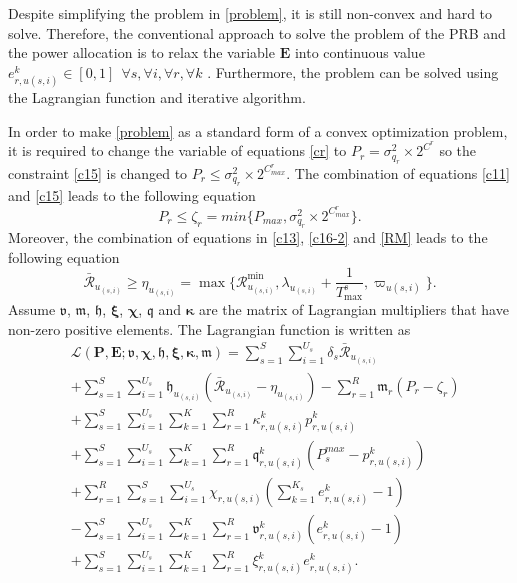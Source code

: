 \documentclass[lettersize,journal]{IEEEtran}
\begin{document}
Despite simplifying the problem in \eqref{problem}, it is still non-convex and hard to solve.
Therefore, the conventional approach to solve the problem of the PRB and the power allocation is to relax the variable $\mathbf{E}$ into continuous value $e_{r,u(s,i)}^k \in [0,1] \:\: \forall s , \forall i ,\forall r, \forall k$ \cite{lee2018dynamic,ali2018joint}.
Furthermore, the problem can be solved using the Lagrangian function and iterative algorithm.

In order to make \eqref{problem} as a standard form of a convex optimization problem, it is required to change the variable of equations \eqref{cr} to $P_r = \sigma_{q_r}^2\times 2^{C^r}$ so the constraint
\eqref{c15} is changed to
 $P_r \leq \sigma_{q_r}^2\times 2^{C^r_{max}}$.
The combination of equations \eqref{c11} and \eqref{c15} leads to the following equation
\begin{equation} \label{pr11}
P_r\leq \zeta_r= min\{P_{max}, \sigma_{q_r}^2\times 2^{C^r_{max}} \}. 
\end{equation}
Moreover, the combination of equations in \eqref{c13}, \eqref{c16-2} and \eqref{RM} leads to the following equation
\begin{equation}\label{RConstr}
\mathcal{\bar{R}}_{u_{(s,i)}} \geq\eta_{u_{(s,i)}}= \max\{\mathcal{R}_{u_{(s,i)}}^{\min}, \lambda_{u_{(s,i)}}+\frac{1}{T^s_{\max}}, \varpi_{u(s,i)} \}. 
\end{equation}
Assume $\boldsymbol{\mathfrak{v}}$, $\boldsymbol{\mathfrak{m}}$, $\boldsymbol{\mathfrak{h}}$, $\boldsymbol{\xi}$, $\boldsymbol{\chi}$, $\boldsymbol{\mathfrak{q}}$ and $\boldsymbol{ \kappa}$ are the matrix of Lagrangian multipliers that have non-zero positive elements. The Lagrangian function is written as
\begin{align}\label{lagrang}
&\mathcal{L}(\boldsymbol{P},\boldsymbol{E}; \boldsymbol{\mathfrak{v}}, \boldsymbol{\chi}, \boldsymbol{\mathfrak{h}}, \boldsymbol{ \xi}, \boldsymbol{ \kappa}, \boldsymbol{\mathfrak{m}})  = \sum\limits_{s=1}^{S} \sum\limits_{i=1}^{U_s}\delta_s\mathcal{\bar{R}}_{u_{(s,i)}}\nonumber\\
&+\sum\limits_{s=1}^{S} \sum\limits_{i=1}^{U_s}\mathfrak{h}_{u_{(s,i)}} (\mathcal{\bar{R}}_{u_{(s,i)}}-\eta_{u_{(s,i)}})-  \sum\limits_{r=1}^{R} \mathfrak{m}_{r} (P_{r}- \zeta_r)\nonumber\\
&+  \sum\limits_{s=1}^{S} \sum\limits_{i=1}^{U_s}\sum\limits_{k=1}^{K} \sum\limits_{r=1}^{R}\kappa^k_{r,u(s,i)}  p^k_{r,u(s,i)}\nonumber\\
&+  \sum\limits_{s=1}^{S} \sum\limits_{i=1}^{U_s}\sum\limits_{k=1}^{K} \sum\limits_{r=1}^{R}\mathfrak{q}^k_{r,u(s,i)} (P^{max}_{s}- p^k_{r,u(s,i)})\nonumber\\
&+ \sum\limits_{r=1}^{R}\sum\limits_{s=1}^{S} \sum\limits_{i=1}^{U_s}\chi_{r,u(s,i)}(\sum_{k =1}^{K_s} e^{k}_{r,u(s,i)} -1)\nonumber\\
&-  \sum\limits_{s=1}^{S} \sum\limits_{i=1}^{U_s}\sum\limits_{k=1}^{K} \sum\limits_{r=1}^{R}\mathfrak{v}^{k}_{r,u(s,i)} (e^{k}_{r,u(s,i)} -1)\nonumber\\
&+  \sum\limits_{s=1}^{S} \sum\limits_{i=1}^{U_s}\sum\limits_{k=1}^{K} \sum\limits_{r=1}^{R} \xi^{k}_{r,u(s,i)} e^{k}_{r,u(s,i)}.
\end{align}
\end{document}
